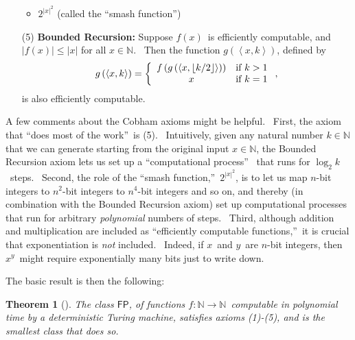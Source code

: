 \documentclass[11pt,onecolumn]{article}%
\newtheorem{theorem}{Theorem}
\begin{document}
\begin{enumerate}
\begin{itemize}
\item $2^{\left\vert x\right\vert ^{2}}$ (called the \textquotedblleft smash
function\textquotedblright)
\end{itemize}

\item[(5)] \textbf{Bounded Recursion:} Suppose $f\left(  x\right)  $\ is
efficiently computable, and $\left\vert f\left(  x\right)  \right\vert
\leq\left\vert x\right\vert $ for all $x\in\mathbb{N}$. \ Then the function
$g\left(  \left\langle x,k\right\rangle \right)  $, defined by%
\[
g\left(  \left\langle x,k\right\rangle \right)  =\left\{
\begin{array}
[c]{cc}%
f\left(  g\left(  \left\langle x,\left\lfloor k/2\right\rfloor \right\rangle
\right)  \right)  & \text{if }k>1\\
x & \text{if }k=1
\end{array}
\right.  ,
\]
is also efficiently computable.
\end{enumerate}

A few comments about the Cobham axioms might be helpful. \ First, the axiom
that \textquotedblleft does most of the work\textquotedblright\ is (5).
\ Intuitively, given any natural number $k\in\mathbb{N}$ that we can generate
starting from the original input $x\in\mathbb{N}$, the Bounded Recursion axiom
lets us set up a \textquotedblleft computational process\textquotedblright%
\ that runs for $\log_{2}k$\ steps. \ Second, the role of the
\textquotedblleft smash function,\textquotedblright\ $2^{\left\vert
x\right\vert ^{2}}$, is to let us map $n$-bit integers to $n^{2}$-bit integers
to $n^{4}$-bit integers and so on, and thereby (in combination with the
Bounded Recursion axiom) set up computational processes that run for arbitrary
\textit{polynomial} numbers of steps. \ Third, although addition and
multiplication are included as \textquotedblleft efficiently computable
functions,\textquotedblright\ it is crucial that exponentiation is
\textit{not} included. \ Indeed, if $x$\ and $y$\ are $n$-bit integers, then
$x^{y}$\ might require exponentially many bits just to write down.

The basic result is then the following:

\begin{theorem}
[\cite{cobham,rose}]\label{cobhamthm}The class $\mathsf{FP}$, of functions
$f:\mathbb{N}\rightarrow\mathbb{N}$\ computable in polynomial time by a
deterministic Turing machine, satisfies axioms (1)-(5), and is the smallest
class that does so.
\end{theorem}
\end{document}
